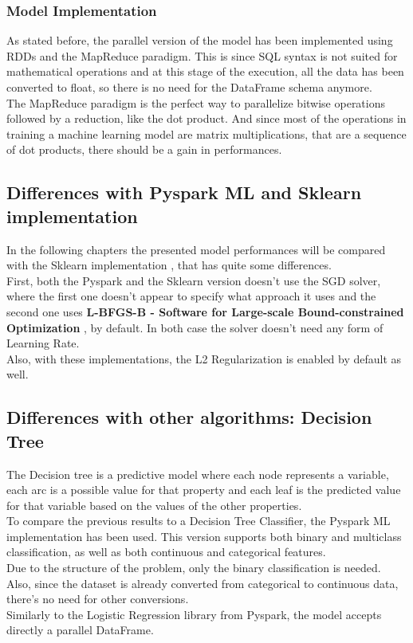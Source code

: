 \documentclass[
	letterpaper, %
	10pt, %
]{class}
\begin{document}
\subsubsection{Model Implementation}
As stated before, the parallel version of the model has been implemented using RDDs and the MapReduce paradigm. This is since SQL syntax is not suited for mathematical operations and at this stage of the execution, all the data has been converted to float, so there is no need for the DataFrame schema anymore.\\
The MapReduce paradigm is the perfect way to parallelize bitwise operations followed by a reduction, like the dot product. And since most of the operations in training a machine learning model are matrix multiplications, that are a sequence of dot products, there should be a gain in performances.

\subsection{Differences with Pyspark ML and Sklearn implementation}

In the following chapters the presented model performances will be compared with the Sklearn implementation \cite{logisticsklearn}, that has quite some differences.\\
First, both the Pyspark and the Sklearn version doesn't use the SGD solver, where the first one doesn't appear to specify what approach it uses and the second one uses \textbf{L-BFGS-B - Software for Large-scale Bound-constrained Optimization} \cite{lbfgsb}, by default.
In both case the solver doesn't need any form of Learning Rate.\\
Also, with these implementations, the L2 Regularization is enabled by default as well.

\subsection{Differences with other algorithms: Decision Tree}
The Decision tree is a predictive model where each node represents a variable, each arc is a possible value for that property and each leaf is the predicted value for that variable based on the values of the other properties.\\
To compare the previous results to a Decision Tree Classifier, the Pyspark ML implementation has been used. This version supports both binary and multiclass classification, as well as both continuous and categorical features.\\
Due to the structure of the problem, only the binary classification is needed. Also, since the dataset is already converted from categorical to continuous data, there's no need for other conversions.\\
Similarly to the Logistic Regression library from Pyspark, the model accepts directly a parallel DataFrame.
\end{document}
